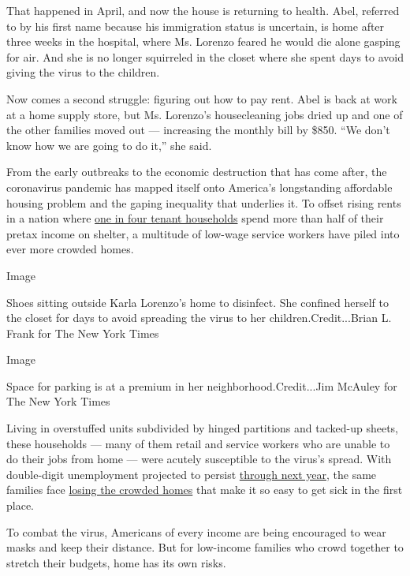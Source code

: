 That happened in April, and now the house is returning to health. Abel,
referred to by his first name because his immigration status is
uncertain, is home after three weeks in the hospital, where Ms. Lorenzo
feared he would die alone gasping for air. And she is no longer
squirreled in the closet where she spent days to avoid giving the virus
to the children.

Now comes a second struggle: figuring out how to pay rent. Abel is back
at work at a home supply store, but Ms. Lorenzo's housecleaning jobs
dried up and one of the other families moved out --- increasing the
monthly bill by \$850. ``We don't know how we are going to do it,'' she
said.

From the early outbreaks to the economic destruction that has come
after, the coronavirus pandemic has mapped itself onto America's
longstanding affordable housing problem and the gaping inequality that
underlies it. To offset rising rents in a nation where
\href{https://www.jchs.harvard.edu/sites/default/files/Harvard_JCHS_Americas_Rental_Housing_2020.pdf}{one
in four tenant households} spend more than half of their pretax income
on shelter, a multitude of low-wage service workers have piled into ever
more crowded homes.

Image

Shoes sitting outside Karla Lorenzo's home to disinfect. She confined
herself to the closet for days to avoid spreading the virus to her
children.Credit...Brian L. Frank for The New York Times

Image

Space for parking is at a premium in her neighborhood.Credit...Jim
McAuley for The New York Times

Living in overstuffed units subdivided by hinged partitions and
tacked-up sheets, these households --- many of them retail and service
workers who are unable to do their jobs from home --- were acutely
susceptible to the virus's spread. With double-digit unemployment
projected to persist
\href{https://www.nytimes3xbfgragh.onion/2020/07/15/business/economy/economic-recovery-coronavirus-resurgence.html}{through
next year}, the same families face
\href{https://www.nytimes3xbfgragh.onion/2020/05/27/us/coronavirus-evictions-renters.html}{losing
the crowded homes} that make it so easy to get sick in the first place.

To combat the virus, Americans of every income are being encouraged to
wear masks and keep their distance. But for low-income families who
crowd together to stretch their budgets, home has its own risks.

